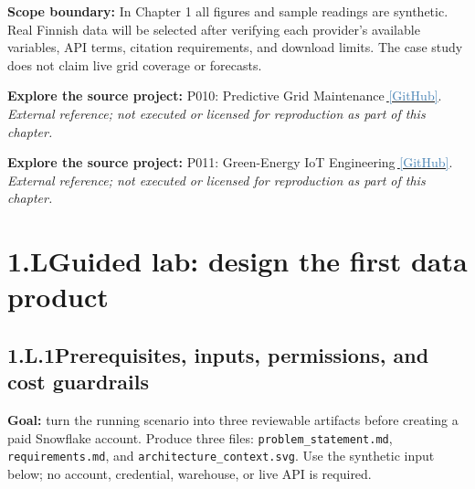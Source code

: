 \documentclass[11pt,twoside]{article}
\newcommand{\topic}[2]{\subsection*{#1\quad #2}}
\newcommand{\repo}[2]{\par\begingroup\small\sffamily\color{inkgray}\textbf{Explore the source project:} #1\,\href{#2}{\,\textcolor{steelblue}{[GitHub]}}. \textit{External reference; not executed or licensed for reproduction as part of this chapter.}\par\endgroup}
\begin{document}
\begin{whitebox}
\textbf{Scope boundary:} In Chapter 1 all figures and sample readings are synthetic. Real Finnish data will be selected after verifying each provider's available variables, API terms, citation requirements, and download limits. The case study does not claim live grid coverage or forecasts.
\end{whitebox}
\repo{P010: Predictive Grid Maintenance}{https://github.com/Snowflake-Labs/sfguide-ai-powered-predictive-grid-maintenance}
\repo{P011: Green-Energy IoT Engineering}{https://github.com/nbaubek/green-energy-iot-de-project}

\section*{1.L\quad Guided lab: design the first data product}
\topic{1.L.1}{Prerequisites, inputs, permissions, and cost guardrails}
\textbf{Goal:} turn the running scenario into three reviewable artifacts before creating a paid Snowflake account. Produce three files: \texttt{problem\_statement.md}, \texttt{requirements.md}, and \texttt{architecture\_context.svg}. Use the synthetic input below; no account, credential, warehouse, or live API is required.
\end{document}
